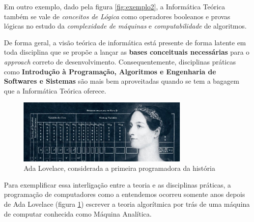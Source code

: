 \documentclass{article}
\begin{document}
Em outro exemplo, dado pela figura \ref{fig:exemplo2}, a Informática Teórica também se vale de \textit{conceitos de Lógica} como operadores booleanos e provas lógicas no estudo da \textit{complexidade de máquinas} e \textit{computabilidade} de algoritmos. 
\cite{complexity}

De forma geral, a visão teórica de informática está presente de forma latente em toda disciplina que se propõe a lançar as \textbf{bases conceituais necessárias} para o \textit{approach} correto de desenvolvimento. Consequentemente, disciplinas práticas como \textbf{Introdução à Programação, Algoritmos e Engenharia de Softwares e Sistemas} são mais bem aproveitadas quando se tem a bagagem que a Informática Teórica oferece. 

\begin{figure}[ht]
    \centering
    \includegraphics[width=0.75\textwidth]{adalov}
    \caption{Ada Lovelace, considerada a primeira programadora da história}
    \label{fig:ada}
\end{figure}

 Para exemplificar essa interligação entre a teoria e as disciplinas práticas, a programação de computadores como a entendemos ocorreu somente anos depois de Ada Lovelace (figura \ref{fig:ada}) escrever a teoria algorítmica por trás de uma máquina de computar conhecida como Máquina Analítica.\cite{adalovelace}

\printbibliography[
heading=bibintoc,
title={Referências}
]
\end{document}

